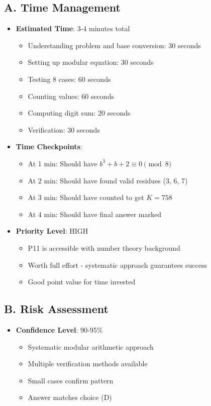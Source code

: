 \documentclass[11pt]{article}
\begin{document}
\begin{competitionbox}
\subsection*{A. Time Management}
\begin{itemize}[leftmargin=*]
    \item \textbf{Estimated Time}: 3-4 minutes total
    \begin{itemize}
        \item Understanding problem and base conversion: 30 seconds
        \item Setting up modular equation: 30 seconds
        \item Testing 8 cases: 60 seconds
        \item Counting values: 60 seconds
        \item Computing digit sum: 20 seconds
        \item Verification: 30 seconds
    \end{itemize}
    
    \item \textbf{Time Checkpoints}: 
    \begin{itemize}
        \item At 1 min: Should have $b^3 + b + 2 \equiv 0 \pmod{8}$
        \item At 2 min: Should have found valid residues (3, 6, 7)
        \item At 3 min: Should have counted to get $K = 758$
        \item At 4 min: Should have final answer marked
    \end{itemize}
    
    \item \textbf{Priority Level}: HIGH
    \begin{itemize}
        \item P11 is accessible with number theory background
        \item Worth full effort - systematic approach guarantees success
        \item Good point value for time invested
    \end{itemize}
\end{itemize}

\subsection*{B. Risk Assessment}
\begin{itemize}[leftmargin=*]
    \item \textbf{Confidence Level}: 90-95\%
    \begin{itemize}
        \item Systematic modular arithmetic approach
        \item Multiple verification methods available
        \item Small cases confirm pattern
        \item Answer matches choice (D)
    \end{itemize}
    

\end{itemize}
\end{competitionbox}
\end{document}
